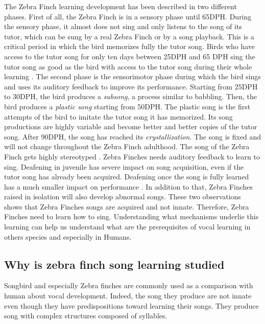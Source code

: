 \documentclass{report}
\begin{document}
The Zebra Finch learning development has been described in two different phases.
First of all, the Zebra Finch is in a sensory phase until 65DPH. During the
sensory phase, it almost does not sing and only listens to the song of its
tutor, which can be sung by a real Zebra Finch or by a song playback. This is a
critical period in which the bird memorizes fully the tutor song. Birds who have
access to the tutor song for only ten days between 25DPH and 65 DPH sing the
tutor song as good as the bird with access to the tutor song during their whole
learning \parencite{bohner_early_1990, roper_onset_2006}. The second phase is
the sensorimotor phase during which the bird sings and uses its auditory
feedback to improve its performance. Starting from 25DPH to 30DPH, the bird
produces a \emph{subsong}, a process similar to babbling. Then, the bird
produces a \emph{plastic song} starting from 50DPH. The plastic song is the
first attempts of the bird to imitate the tutor song it has memorized. Its song
productions are highly variable and become better and better copies of the tutor
song. After 90DPH, the song has reached its \emph{crystallization}. The song is
fixed and will not change throughout the Zebra Finch adulthood. The song of the
Zebra Finch gets highly stereotyped \parencite{williams_birdsong_2004}. Zebra
Finches needs auditory feedback to learn to sing. Deafening in juvenile has
severe impact on song acquisition, even if the tutor song has already been
acquired. Deafening once the song is fully learned has a much smaller impact on
performance \parencite{scharff_comparative_1991, doupe_birdsong_1999}. In
addition to that, Zebra Finches raised in isolation will also develop abnormal
songs. These two observations shows that Zebra Finches songs are acquired and
not innate. Therefore, Zebra Finches need to learn how to sing. Understanding
what mechanisms underlie this learning can help us understand what are the
prerequisites of vocal learning in others species and especially in Humans.

\subsection{Why is zebra finch song learning
studied}\label{why-is-zebra-finch-song-learning-studied}

Songbird and especially Zebra finches are commonly used as a comparison with
human about vocal development. Indeed, the song they produce are not innate even
though they have predispositions toward learning their songs. They produce
song with complex structures composed of syllables.
\end{document}
